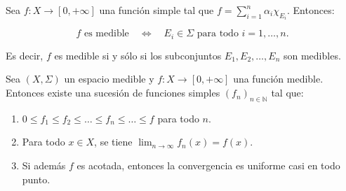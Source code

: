 \begin{observación}
Sea \( f: X \to [0, +\infty] \) una función simple tal que \( f = \sum_{i=1}^{n} \alpha_i \chi_{E_i} \). Entonces:

\[
    f \text{ es medible} \quad \iff \quad E_i \in \Sigma \text{ para todo } i = 1, \dots, n.
\]

Es decir, \( f \) es medible si y sólo si los subconjuntos \( E_1, E_2, \dots,
E_n \) son medibles.
\end{observación}

\begin{teorema}
    Sea \((X, \Sigma)\) un espacio medible y \(f: X \to [0, +\infty]\) una función medible. Entonces existe una sucesión de funciones simples \((f_n)_{n \in \mathbb{N}}\) tal que:
    \begin{enumerate}[label=(\roman*)]
        \item \(0 \leq f_1 \leq f_2 \leq \dots \leq f_n \leq \dots \leq f\) para todo \(n\).
        \item Para todo \(x \in X\), se tiene \(\displaystyle \lim_{n \to \infty} f_n(x) =
              f(x)\).
        \item Si además \(f\) es acotada, entonces la convergencia es uniforme casi en todo
              punto.
    \end{enumerate}
\end{teorema}

